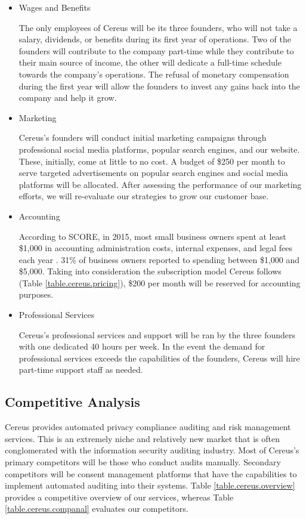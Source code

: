 \begin{itemize}

\item Wages and Benefits

The only employees of Cereus will be its three founders, who will not take a salary, dividends, or benefits during its first year of operations. Two of the founders will contribute to the company part-time while they contribute to their main source of income, the other will dedicate a full-time schedule towards the company's operations. The refusal of monetary compensation during the first year will allow the founders to invest any gains back into the company and help it grow.

\item Marketing

Cereus's founders will conduct initial marketing campaigns through professional social media platforms, popular search engines, and our website. These, initially, come at little to no cost. A budget of \$250 per month to serve targeted advertisements on popular search engines and social media platforms will be allocated. After assessing the performance of our marketing efforts, we will re-evaluate our strategies to grow our customer base.

\item Accounting

According to SCORE, in 2015, most small business owners spent at least \$1,000 in accounting administration costs, internal expenses, and legal fees each year \cite{score.2016}. 31\% of business owners reported to spending between \$1,000 and \$5,000. Taking into consideration the subscription model Cereus follows (Table \ref{table.cereus.pricing}), \$200 per month will be reserved for accounting purposes.

\item Professional Services

Cereus's professional services and support will be ran by the three founders with one dedicated 40 hours per week. In the event the demand for professional services exceeds the capabilities of the founders, Cereus will hire part-time support staff as needed.

\end{itemize}

\subsection{Competitive Analysis}

Cereus provides automated privacy compliance auditing and risk management services. This is an extremely niche and relatively new market that is often conglomerated with the information security auditing industry. Most of Cereus's primary competitors will be those who conduct audits manually. Secondary competitors will be consent management platforms that have the capabilities to implement automated auditing into their systems. Table \ref{table.cereus.overview} provides a competitive overview of our services, whereas Table \ref{table.cereus.companal} evaluates our competitors.

